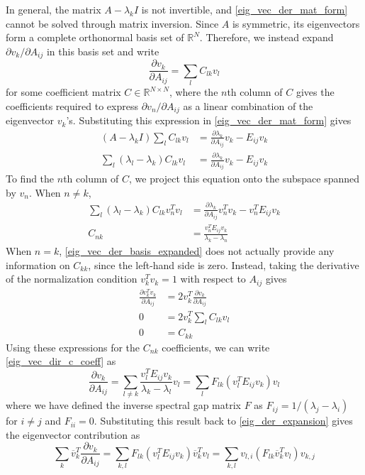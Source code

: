 \documentclass[11pt, a4paper]{article}
\begin{document}
In general, the matrix $A-\lambda_kI$ is not invertible, and \eqref{eig_vec_der_mat_form} cannot be solved through matrix inversion. Since $A$ is symmetric, its eigenvectors form a complete orthonormal basis set of $\mathbb R^N$. Therefore, we instead expand $\partial v_k/\partial A_{ij}$ in this basis set and write
\begin{equation}
    \frac{\partial v_{k}}{\partial A_{ij}}= \sum_l C_{lk}v_{l} \label{eig_vec_dir_c_coeff}
\end{equation}
for some coefficient matrix $C\in\mathbb R^{N\times N}$, where the $n$th column of $C$ gives the coefficients required to express $\partial v_n/\partial A_{ij}$ as a linear combination of the eigenvector $v_k$'s. Substituting this expression in \eqref{eig_vec_der_mat_form} gives
\begin{align}
    (A - \lambda_k I)\sum_l C_{lk}v_{l} & = \frac{\partial\lambda_k}{\partial A_{ij}}v_{k} - E_{ij}v_k \\
    \sum_l (\lambda_l - \lambda_k) C_{lk}v_l & = \frac{\partial\lambda_k}{\partial A_{ij}}v_{k} - E_{ij}v_k \label{eig_vec_der_basis_expanded}
\end{align}
To find the $n$th column of $C$, we project this equation onto the subspace spanned by $v_n$. When $n\ne k$,
\begin{align}
    \sum_l (\lambda_l - \lambda_k) C_{lk} v_n^Tv_l & = \frac{\partial\lambda_k}{\partial A_{ij}}v_n^Tv_{k} - v_n^TE_{ij}v_k \\
    C_{nk} & = \frac{v_n^TE_{ij}v_k}{\lambda_k - \lambda_n}
\end{align}
When $n = k$, \eqref{eig_vec_der_basis_expanded} does not actually provide any information on $C_{kk}$, since the left-hand side is zero. Instead, taking the derivative of the normalization condition $v_k^Tv_k=1$ with respect to $A_{ij}$ gives
\begin{align}
    \frac{\partial v_k^Tv_k}{\partial A_{ij}} & = 2v_k^T\frac{\partial v_k}{\partial A_{ij}} \\
    0 & = 2v_k^T\sum_l C_{lk}v_{l} \\
    0 & = C_{kk}
\end{align}
Using these expressions for the $C_{nk}$ coefficients, we can write \eqref{eig_vec_dir_c_coeff} as
\begin{equation}
    \frac{\partial v_k}{\partial A_{ij}} = \sum_{l\ne k} \frac{v_l^TE_{ij}v_k}{\lambda_k - \lambda_l}v_{l} = \sum_l F_{lk }(v_l^TE_{ij}v_k)v_l \label{eig_vec_der_asym}
\end{equation}
where we have defined the inverse spectral gap matrix $F$ as $F_{ij}=1/(\lambda_j - \lambda_i)$ for $i\ne j$ and $F_{ii}=0$. Substituting this result back to \eqref{eig_der_expansion} gives the eigenvector contribution as
\begin{equation}
    \sum_k \overline{v}_k^T \frac{\partial v_k}{\partial A_{ij}} = \sum_{k,l} F_{lk} (v_l^TE_{ij}v_k) \overline{v}_k^Tv_l = \sum_{k,l} v_{l,i} (F_{lk}\overline{v}_k^Tv_l) v_{k,j} \label{eig_vec_der_pre_matrix_form}
\end{equation}
\end{document}
